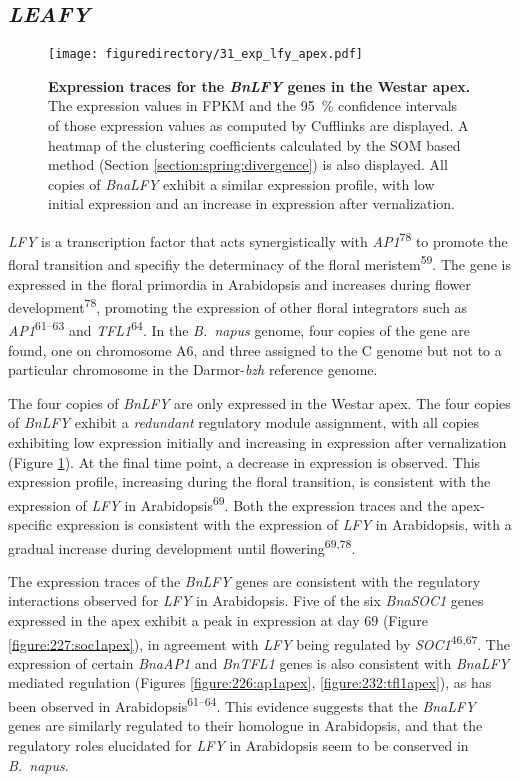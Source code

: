 \documentclass[12pt,]{book}
\begin{document}
\subsection{\texorpdfstring{\emph{LEAFY}}{LEAFY}}\label{section:spring:lfy}

\begin{figure}[htbp]
\centering
\texttt{[image: figuredirectory/31\_exp\_lfy\_apex.pdf]}
\caption{\textbf{Expression traces for the \emph{BnLFY} genes in the
Westar apex.} The expression values in FPKM and the 95~\% confidence
intervals of those expression values as computed by Cufflinks are
displayed. A heatmap of the clustering coefficients calculated by the
SOM based method (Section \ref{section:spring:divergence}) is also
displayed. All copies of \emph{BnaLFY} exhibit a similar expression
profile, with low initial expression and an increase in expression after
vernalization.}\label{figure:231:lfyapex}
\end{figure}

\emph{LFY} is a transcription factor that acts synergistically with
\emph{AP1}\textsuperscript{78} to promote the floral transition and
specifiy the determinacy of the floral meristem\textsuperscript{59}. The
gene is expressed in the floral primordia in Arabidopsis and increases
during flower development\textsuperscript{78}, promoting the expression
of other floral integrators such as \emph{AP1}\textsuperscript{61--63}
and \emph{TFL1}\textsuperscript{64}. In the \emph{B.~napus} genome, four
copies of the gene are found, one on chromosome A6, and three assigned
to the C genome but not to a particular chromosome in the
Darmor-\emph{bzh} reference genome.

The four copies of \emph{BnLFY} are only expressed in the Westar apex.
The four copies of \emph{BnLFY} exhibit a \emph{redundant} regulatory
module assignment, with all copies exhibiting low expression initially
and increasing in expression after vernalization (Figure
\ref{figure:231:lfyapex}). At the final time point, a decrease in
expression is observed. This expression profile, increasing during the
floral transition, is consistent with the expression of \emph{LFY} in
Arabidopsis\textsuperscript{69}. Both the expression traces and the
apex-specific expression is consistent with the expression of \emph{LFY}
in Arabidopsis, with a gradual increase during development until
flowering\textsuperscript{69,78}.

The expression traces of the \emph{BnLFY} genes are consistent with the
regulatory interactions observed for \emph{LFY} in Arabidopsis. Five of
the six \emph{BnaSOC1} genes expressed in the apex exhibit a peak in
expression at day 69 (Figure \ref{figure:227:soc1apex}), in agreement
with \emph{LFY} being regulated by \emph{SOC1}\textsuperscript{46,67}.
The expression of certain \emph{BnaAP1} and \emph{BnTFL1} genes is also
consistent with \emph{BnaLFY} mediated regulation (Figures
\ref{figure:226:ap1apex}, \ref{figure:232:tfl1apex}), as has been
observed in Arabidopsis\textsuperscript{61--64}. This evidence suggests
that the \emph{BnaLFY} genes are similarly regulated to their homologue
in Arabidopsis, and that the regulatory roles elucidated for \emph{LFY}
in Arabidopsis seem to be conserved in \emph{B.~napus}.
\end{document}
